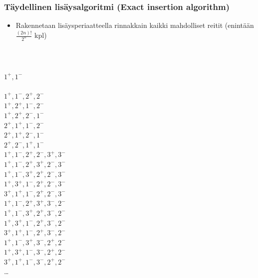 \documentclass{beamer}
\begin{document}
    \begin{frame}
\frametitle{Täydellinen lisäysalgoritmi (Exact insertion algorithm)}
 \begin{itemize}
 \item
Rakennetaan lisäysperiaatteella rinnakkain kaikki mahdolliset reitit (enintään $\frac{(2n)!}{2^n}$ kpl)
\end{itemize}
\hfill \\
  \begin{columns}[c]
  \column{0.7in}
  \column{2.5in}  %
 $1^+,1^-$ \\
 \hfill \\
  $1^+,1^-,2^+,2^-$ \\
    $1^+,2^+,1^-,2^-$ \\
     $1^+,2^+,2^-,1^-$ \\
      $2^+,1^+,1^-,2^-$ \\
      $2^+,1^+,2^-,1^-$ \\
      $2^+,2^-,1^+,1^-$ \\
      \column{2.5in}
      {\tiny 
        $1^+,1^-,2^+,2^-,3^+,3^-$ \\
        $1^+,1^-,2^+,3^+,2^-,3^-$ \\
        $1^+,1^-,3^+,2^+,2^-,3^-$ \\
        $1^+,3^+,1^-,2^+,2^-,3^-$ \\
        $3^+,1^+,1^-,2^+,2^-,3^-$ \\
        
        $1^+,1^-,2^+,3^+,3^-,2^-$ \\
        $1^+,1^-,3^+,2^+,3^-,2^-$ \\
        $1^+,3^+,1^-,2^+,3^-,2^-$ \\
        $3^+,1^+,1^-,2^+,3^-,2^-$ \\
        
        $1^+,1^-,3^+,3^-,2^+,2^-$ \\
        $1^+,3^+,1^-,3^-,2^+,2^-$ \\
        $3^+,1^+,1^-,3^-,2^+,2^-$ \\
        
      \ldots
      }
      \end{columns}
\end{frame}
    
\end{document}
